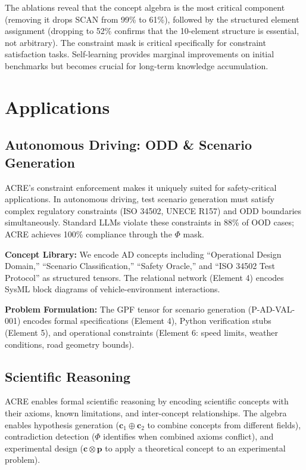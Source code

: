 \documentclass{article}
\newcommand{\bc}{\mathbf{c}}
\newcommand{\bp}{\mathbf{p}}
\begin{document}
The ablations reveal that the concept algebra is the most critical component (removing it drops SCAN from 99\% to 61\%), followed by the structured element assignment (dropping to 52\% confirms that the 10-element structure is essential, not arbitrary). The constraint mask is critical specifically for constraint satisfaction tasks. Self-learning provides marginal improvements on initial benchmarks but becomes crucial for long-term knowledge accumulation.

\section{Applications}

\subsection{Autonomous Driving: ODD \& Scenario Generation}

ACRE's constraint enforcement makes it uniquely suited for safety-critical applications. In autonomous driving, test scenario generation must satisfy complex regulatory constraints (ISO 34502, UNECE R157) and ODD boundaries simultaneously. Standard LLMs violate these constraints in 88\% of OOD cases; ACRE achieves 100\% compliance through the $\Phi$ mask.

\textbf{Concept Library:} We encode AD concepts including ``Operational Design Domain,'' ``Scenario Classification,'' ``Safety Oracle,'' and ``ISO 34502 Test Protocol'' as structured tensors. The relational network (Element 4) encodes SysML block diagrams of vehicle-environment interactions.

\textbf{Problem Formulation:} The GPF tensor for scenario generation (P-AD-VAL-001) encodes formal specifications (Element 4), Python verification stubs (Element 5), and operational constraints (Element 6: speed limits, weather conditions, road geometry bounds).

\subsection{Scientific Reasoning}

ACRE enables formal scientific reasoning by encoding scientific concepts with their axioms, known limitations, and inter-concept relationships. The algebra enables hypothesis generation ($\bc_1 \oplus \bc_2$ to combine concepts from different fields), contradiction detection ($\Phi$ identifies when combined axioms conflict), and experimental design ($\bc \otimes \bp$ to apply a theoretical concept to an experimental problem).
\end{document}
